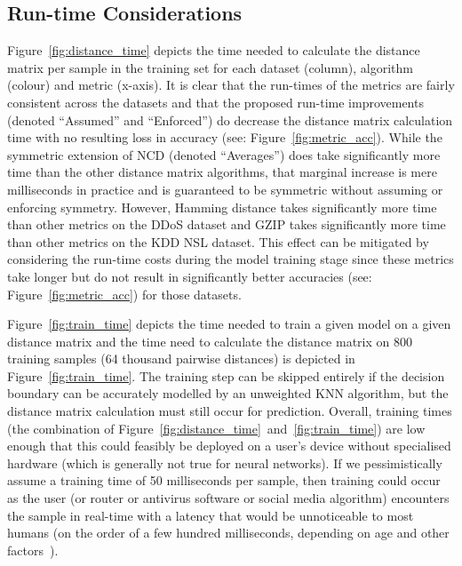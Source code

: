 \documentclass[preprint,12pt]{elsarticle}
\begin{document}
\subsection{Run-time Considerations}

Figure~\ref{fig:distance_time} depicts the time needed to calculate the distance matrix per sample in the training set for each dataset (column), algorithm (colour) and metric (x-axis). 
It is clear that the run-times of the metrics are fairly consistent across the datasets and that the proposed run-time improvements (denoted ``Assumed'' and ``Enforced'') do decrease the distance matrix calculation time with no resulting loss in accuracy (see: Figure~\ref{fig:metric_acc}). 
While the symmetric extension of NCD (denoted ``Averages'') does take significantly more time than the other distance matrix algorithms, that marginal increase is mere milliseconds in practice and is guaranteed to be symmetric without assuming or enforcing symmetry. 
However, Hamming distance takes significantly more time than other metrics on the DDoS dataset and GZIP takes significantly more time than other metrics on the KDD NSL dataset. 
This effect can be mitigated by considering the run-time costs during the model training stage since these metrics take longer but do not result in significantly better accuracies (see: Figure~\ref{fig:metric_acc}) for those datasets. 

Figure~\ref{fig:train_time} depicts the time needed to train a given model on a given distance matrix and the time need to calculate the distance matrix on 800 training samples (64 thousand pairwise distances) is depicted in Figure~\ref{fig:train_time}.
The training step can be skipped entirely if the decision boundary can be accurately modelled by an unweighted KNN algorithm, but the distance matrix calculation must still occur for prediction.
Overall, training times (the combination of Figure~\ref{fig:distance_time}~and~\ref{fig:train_time}) are low enough that this could feasibly be deployed on a user's device without specialised hardware (which is generally not true for neural networks). 
If we pessimistically assume a training time of 50 milliseconds per sample, then training could occur as the user (or router or antivirus software or social media algorithm) encounters the sample in real-time with a latency that would be unnoticeable to most humans (on the order of a  few hundred milliseconds, depending on age and other factors~\cite{reaction_time}). 
\end{document}
